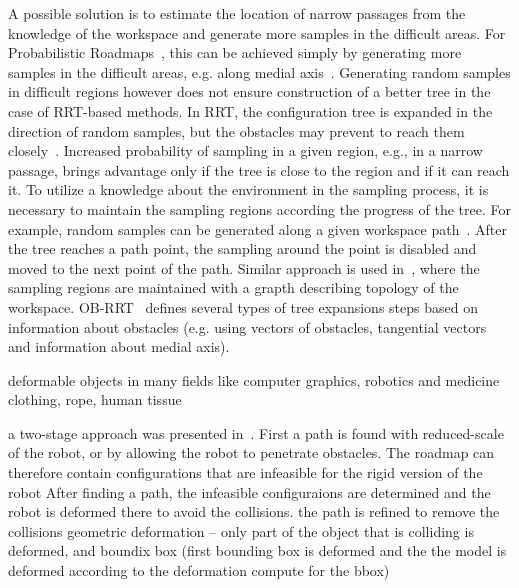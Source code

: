 \documentclass{svmult}
\begin{document}
A possible solution is to estimate the location of narrow passages from the knowledge of the workspace and generate more samples
in the difficult areas.
For Probabilistic Roadmaps~\cite{kavrakiPRM}, this can be achieved simply by generating more samples in the difficult areas, e.g. along
medial axis~\cite{wilmarthMAPRM,foskey01hybrid,guibas1999probabilistic,hoff2000interactive,yang2004adapting}.
Generating random samples in difficult regions however does not ensure construction of a better tree in the case of RRT-based methods. 
In RRT, the configuration tree is expanded in the direction of random samples, but the obstacles may prevent to reach them closely~\cite{vonasekphd}.
Increased probability of sampling in a given region, e.g., in a narrow passage, 
brings advantage only if the tree is close to the region and if it can reach it.
To utilize a knowledge about the environment in the sampling process, 
it is necessary to maintain the sampling regions according the progress of the tree.
For example, random samples can be generated along a given workspace path~\cite{vonasek2009rrt}.
After the tree reaches a path point, the sampling around the point is disabled and moved to the next point of 
the path.
Similar approach is used in~\cite{denny2014marrt}, where the sampling regions are maintained with a grapth describing topology 
of the workspace.
OB-RRT~\cite{amatoOBRRT} defines several types of tree expansions
steps based on information about obstacles (e.g. using vectors of obstacles, tangential vectors and information about medial axis).


deformable objects in many fields like computer graphics, robotics and medicine~\cite{alterovitz2008motion}
clothing, rope, human tissue

a two-stage approach was presented in~\cite{bayazit2002deformable}. 
First a path is found with reduced-scale of the robot, or by allowing the robot to penetrate obstacles.
The roadmap can therefore contain configurations that are infeasible for the rigid version of the robot
After finding a path, the infeasible configuraions are determined and the robot is deformed there to avoid the collisions.
the path is refined to remove the collisions
geometric deformation -- only part of the object that is colliding is deformed,
and boundix box (first bounding box is deformed and the the model is deformed according to the deformation compute for the bbox)
\end{document}
